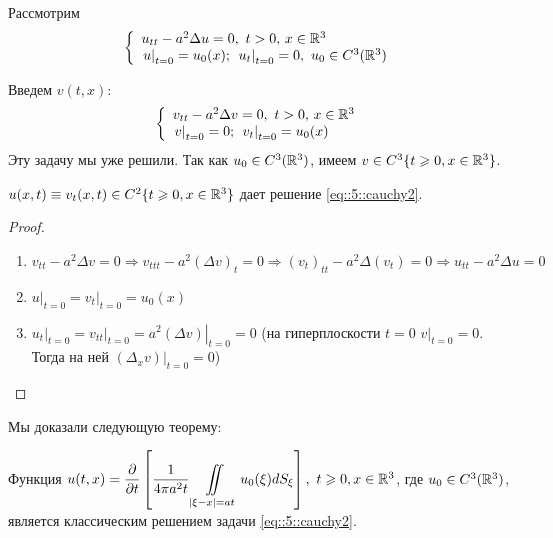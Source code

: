 \documentclass[../main.tex]{subfiles}
\begin{document}
Рассмотрим
\begin{equation}
\left\{
  \begin{array}{ll}
  u_{tt}-a^2\Delta u=0,\ t>0,\, x\in \mathbb{R}^3\\
  \left. u\right|_{t=0}=u_0(x);\ \left. u_t\right|_{t=0}=0,\ u_0\in C^3(\mathbb{R}^3)
  \end{array}
\right.
\label{eq::5::cauchy2}
\end{equation}

Введем $v(t, x)$:
\[
\left\{
  \begin{array}{ll}
  v_{tt}-a^2\Delta v=0,\ t>0,\, x\in \mathbb{R}^3\\
  \left. v\right|_{t=0}=0;\ \left. v_t\right|_{t=0}=u_0(x)
  \end{array}
\right.
\]
Эту задачу мы уже решили. Так как $u_0\in C^3(\mathbb{R}^3)$, имеем $v\in C^3\{t\geqslant 0, x\in\mathbb{R}^3\}$.
\begin{statement}
$u(x, t)\equiv v_t(x, t)\in C^2\{t\geqslant 0, x\in\mathbb{R}^3 \}$ дает решение \eqref{eq::5::cauchy2}.
\end{statement}
\begin{proof}$\ $
\begin{enumerate}
\item $v_{tt}-a^2\Delta v=0 \Rightarrow v_{ttt}-a^2(\Delta v)_t=0\Rightarrow (v_t)_{tt}-a^2\Delta (v_t)=0\Rightarrow u_{tt}-a^2\Delta u=0$
\item $\left. u\right|_{t=0}=\left. v_t\right|_{t=0}=u_0(x)$
\item $\left. u_t\right|_{t=0}=\left. v_{tt}\right|_{t=0}=\left. a^2(\Delta v)\right|_{t=0}=0$ (на гиперплоскости $t=0$ $\left. v\right|_{t=0}=0$. Тогда на ней $\left. (\Delta_x v)\right|_{t=0}=0$)
\end{enumerate}
\end{proof}
Мы доказали следующую теорему:
\begin{theorem}
Функция $u(t,x)=\dfrac{\partial}{\partial t}\left[\dfrac{1}{4\pi a^2t}\displaystyle\iint\limits_{|\xi -x|=at}u_0(\xi )dS_{\xi } \right],\ t\geqslant 0,x\in\mathbb{R}^3$, где $u_0\in C^3(\mathbb{R}^3)$, является классическим решением задачи \eqref{eq::5::cauchy2}. 
\end{theorem}
\end{document}
